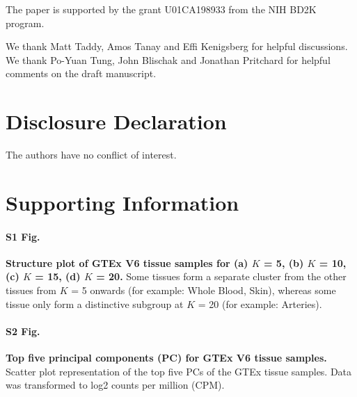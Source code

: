 \documentclass[10pt,letterpaper]{article}
\begin{document}
The paper is supported by the grant U01CA198933 from the NIH BD2K program.

We thank Matt Taddy, Amos Tanay and Effi Kenigsberg for helpful discussions. We thank Po-Yuan Tung, John Blischak and Jonathan Pritchard for helpful comments on the draft manuscript.

\section*{Disclosure Declaration}

The authors have no conflict of interest.

\nolinenumbers



\section*{Supporting Information}
\paragraph*{S1 Fig.}
\label{figS1}
\textbf{Structure plot of GTEx V6 tissue samples for (a) $K$ = 5, (b) $K$ = 10, (c) $K$ = 15, (d) $K$ = 20.} Some tissues form a separate cluster from the other tissues from $K$ = 5 onwards (for example: Whole Blood, Skin), whereas some tissue only form a distinctive subgroup at $K$ = 20 (for example: Arteries).

\paragraph*{S2 Fig.}
\label{figS2}
\textbf{Top five principal components (PC) for GTEx V6 tissue samples.} Scatter plot
representation of the top five PCs of the GTEx tissue samples. Data was transformed to log2 counts per million (CPM).
\end{document}
